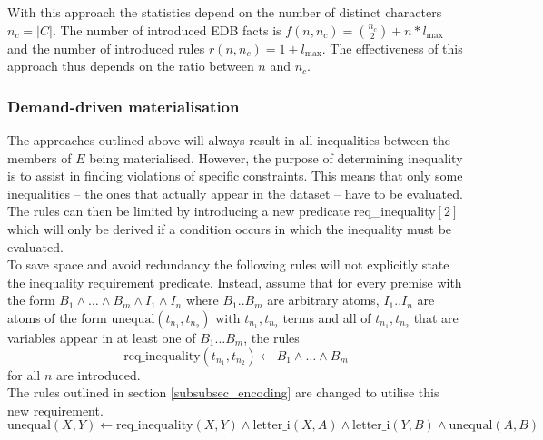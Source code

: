 \documentclass[hyperref,bachelorofscience,fleqn]{cgvpub}
\begin{document}
With this approach the statistics depend on the number of distinct characters \(n_c = |C|\). The number of introduced EDB facts is \(f(n, n_c) = \binom{n_c}{2} + n*l_{\max}\) and the number of introduced rules \(r(n, n_c) = 1 + l_{\max}\). The effectiveness of this approach thus depends on the ratio between \(n\) and \(n_c\).

\subsubsection{Demand-driven materialisation}
The approaches outlined above will always result in all inequalities between the members of \(E\) being materialised. However, the purpose of determining inequality is to assist in finding violations of specific constraints. This means that only some inequalities -- the ones that actually appear in the dataset -- have to be evaluated. The rules can then be limited by introducing a new predicate req\_inequality\([2]\) which will only be derived if a condition occurs in which the inequality must be evaluated.\\

To save space and avoid redundancy the following rules will not explicitly state the inequality requirement predicate. Instead, assume that for every premise with the form \(B_1 \wedge \ldots\wedge B_m \wedge I_1 \wedge I_n\) where \(B_1 .. B_m\) are arbitrary atoms, \(I_1 .. I_n\) are atoms of the form \(\text{unequal}(t_{n_1}, t_{n_2})\) with \(t_{n_1}, t_{n_2}\) terms and all of \(t_{n_1}, t_{n_2}\) that are variables appear in at least one of \(B_1 \ldots B_m\), the rules 
\begin{equation*}
\text{req\_inequality}(t_{n_1}, t_{n_2})
 \leftarrow B_1 \wedge \ldots \wedge B_m
\end{equation*} for all \(n\) are introduced.\\

The rules outlined in section \ref{subsubsec_encoding} are changed to utilise this new requirement.
\begin{equation*}
\text{unequal}(X, Y) \leftarrow \text{req\_inequality}(X, Y) \wedge \text{letter\_i}(X, A) \wedge \text{letter\_i}(Y, B) \wedge \text{unequal}(A, B)
\end{equation*}

\end{document}
